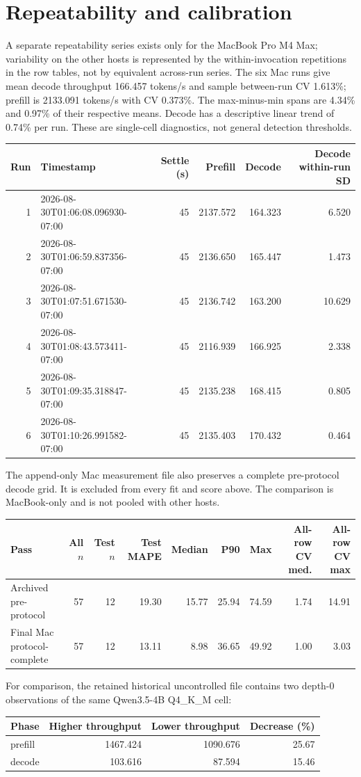 \documentclass[10pt]{article}
\begin{document}
\section{Repeatability and calibration}
A separate repeatability series exists only for the MacBook Pro M4 Max; variability on the other hosts is represented by the within-invocation repetitions in the row tables, not by equivalent across-run series. The six Mac runs give mean decode throughput 166.457 tokens/s and sample between-run CV 1.613\%; prefill is 2133.091 tokens/s with CV 0.373\%. The max-minus-min spans are 4.34\% and 0.97\% of their respective means. Decode has a descriptive linear trend of 0.74\% per run. These are single-cell diagnostics, not general detection thresholds.
\begin{center}
\small
\begin{tabular}{rlrrrr}
\toprule
Run & Timestamp & Settle (s) & Prefill & Decode & Decode within-run SD\\
\midrule
1 & 2026-08-30T01:06:08.096930-07:00 & 45 & 2137.572 & 164.323 & 6.520 \\
2 & 2026-08-30T01:06:59.837356-07:00 & 45 & 2136.650 & 165.447 & 1.473 \\
3 & 2026-08-30T01:07:51.671530-07:00 & 45 & 2136.742 & 163.200 & 10.629 \\
4 & 2026-08-30T01:08:43.573411-07:00 & 45 & 2116.939 & 166.925 & 2.338 \\
5 & 2026-08-30T01:09:35.318847-07:00 & 45 & 2135.238 & 168.415 & 0.805 \\
6 & 2026-08-30T01:10:26.991582-07:00 & 45 & 2135.403 & 170.432 & 0.464 \\
\bottomrule
\end{tabular}
\end{center}
The append-only Mac measurement file also preserves a complete pre-protocol decode grid. It is excluded from every fit and score above. The comparison is MacBook-only and is not pooled with other hosts.
\begin{center}
\small
\begin{tabular}{lrrrrrrrr}
\toprule
Pass & All $n$ & Test $n$ & Test MAPE & Median & P90 & Max & All-row CV med. & All-row CV max\\
\midrule
Archived pre-protocol & 57 & 12 & 19.30 & 15.77 & 25.94 & 74.59 & 1.74 & 14.91 \\
Final Mac protocol-complete & 57 & 12 & 13.11 & 8.98 & 36.65 & 49.92 & 1.00 & 3.03 \\
\bottomrule
\end{tabular}
\end{center}
For comparison, the retained historical uncontrolled file contains two depth-0 observations of the same Qwen3.5-4B Q4\_K\_M cell:
\begin{center}
\small
\begin{tabular}{lrrr}
\toprule
Phase & Higher throughput & Lower throughput & Decrease (\%)\\
\midrule
prefill & 1467.424 & 1090.676 & 25.67 \\
decode & 103.616 & 87.594 & 15.46 \\
\bottomrule
\end{tabular}
\end{center}
\end{document}
